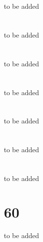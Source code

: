 \documentclass[12pt]{book}
\begin{document}
\section{}
to be added
\section{}
to be added
\section{}
to be added
\section{}
to be added
\section{}
to be added
\section{}
to be added
\section{}
to be added
\section{60}
to be added
\end{document}
